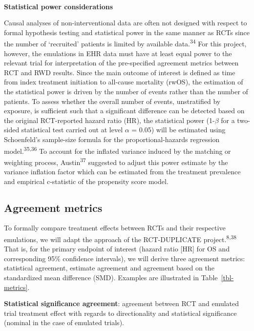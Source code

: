 \documentclass[
  letterpaper,
  DIV=11,
  numbers=noendperiod]{scrartcl}
\makeatletter
\let\oldparagraph\paragraph
\renewcommand{\paragraph}{
    \@ifstar
      \xxxParagraphStar
      \xxxParagraphNoStar
  }
\newcommand{\xxxParagraphStar}[1]{\oldparagraph*{#1}\mbox{}}
\newcommand{\xxxParagraphNoStar}[1]{\oldparagraph{#1}\mbox{}}
\makeatother
\begin{document}
\paragraph{\texorpdfstring{\textbf{Statistical power
considerations}}{Statistical power considerations}}\label{statistical-power-considerations}

Causal analyses of non-interventional data are often not designed with
respect to formal hypothesis testing and statistical power in the same
manner as RCTs since the number of `recruited' patients is limited by
available data.\textsuperscript{34} For this project, however, the
emulations in EHR data must have at least equal power to the relevant
trial for interpretation of the pre-specified agreement metrics between
RCT and RWD results. Since the main outcome of interest is defined as
time from index treatment initiation to all-cause mortality (rwOS), the
estimation of the statistical power is driven by the number of events
rather than the number of patients. To assess whether the overall number
of events, unstratified by exposure, is sufficient such that a
significant difference can be detected based on the original
RCT-reported hazard ratio (HR), the statistical power (1-\(\beta\) for a
two-sided statistical test carried out at level \(\alpha\) = 0.05) will
be estimated using Schoenfeld's sample-size formula for the
proportional-hazards regression model.\textsuperscript{35,36} To account
for the inflated variance induced by the matching or weighting process,
Austin\textsuperscript{37} suggested to adjust this power estimate by
the variance inflation factor which can be estimated from the treatment
prevalence and empirical c-statistic of the propensity score model.

\subsection{Agreement metrics}\label{sec-agreement-metrics}

To formally compare treatment effects between RCTs and their respective
emulations, we will adapt the approach of the RCT-DUPLICATE
project.\textsuperscript{8,38} That is, for the primary endpoint of
interest (hazard ratio {[}HR{]} for OS and corresponding 95\% confidence
intervals), we will derive three agreement metrics: statistical
agreement, estimate agreement and agreement based on the standardized
mean difference (SMD). Examples are illustrated in
Table~\ref{tbl-metrics}.

\textbf{Statistical significance agreement}: agreement between RCT and
emulated trial treatment effect with regards to directionality and
statistical significance (nominal in the case of emulated trials).
\end{document}

